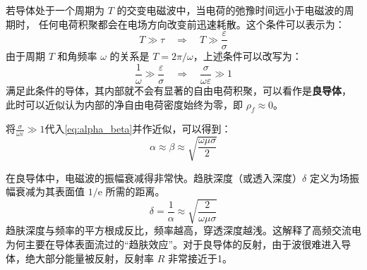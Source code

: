 \documentclass[fontset=none]{ctexart}
\begin{document}
\begin{definition}[良导体]
    
    若导体处于一个周期为 $T$ 的交变电磁波中，当电荷的弛豫时间远小于电磁波的周期时，
    任何电荷积聚都会在电场方向改变前迅速耗散。这个条件可以表示为：
    \begin{equation}
        T \gg \tau \quad \Rightarrow \quad T \gg \frac{\varepsilon}{\sigma}
    \end{equation}
    由于周期 $T$ 和角频率 $\omega$ 的关系是 $T=2\pi/\omega$，上述条件可以改写为：
    \begin{equation}
        \frac{1}{\omega} \gg \frac{\varepsilon}{\sigma} \quad \Rightarrow 
        \quad \frac{\sigma}{\omega\varepsilon} \gg 1
    \end{equation}
    满足此条件的导体，其内部就不会有显著的自由电荷积聚，可以看作是\textbf{良导体}，
    此时可以近似认为内部的净自由电荷密度始终为零，即 $\rho_f \approx 0$。

    将$\frac{\sigma}{\omega\varepsilon} \gg 1$代入\eqref{eq:alpha_beta}并作近似，可以得到：
    \begin{equation}
    \alpha \approx \beta \approx \sqrt{\frac{\omega\mu\sigma}{2}}
    \end{equation}

\end{definition}

\begin{definition}[趋肤深度]
在良导体中，电磁波的振幅衰减得非常快。趋肤深度（或透入深度）$\delta$ 定义为场振幅衰减为其表面值 $1/\mathrm{e}$ 所需的距离。
\begin{equation}
\delta = \frac{1}{\alpha} \approx \sqrt{\frac{2}{\omega\mu\sigma}}
\end{equation}
趋肤深度与频率的平方根成反比，频率越高，穿透深度越浅。这解释了高频交流电为何主要在导体表面流过的“趋肤效应”。对于良导体的反射，由于波很难进入导体，绝大部分能量被反射，反射率 $R$ 非常接近于1。
\end{definition}
\end{document}
